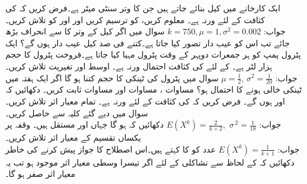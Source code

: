 ایک کارخانے میں کیل بنائے جاتے ہیں جن کا وتر  سنٹی میٹر ہے۔فرض کریں کہ  کی کثافت  کے لئے  ورنہ  ہے۔ معلوم کریں،  کو ترسیم کریں اور  اور  کو تلاش کریں۔ \\
جواب:\quad
$k=750,\mu=1,\sigma^2=0.002$
\quad
سوال  میں اگر کیل کے وتر کا  سے انحراف  بڑھ جائے تب اس کو عیب دار تصور کیا جاتا ہے۔کتنے فی صد کیل عیب دار ہوں گے؟
\quad
ایک پٹرول پمپ کو ہر جمعرات دوپہر کے وقت  پٹرول مہیا کیا جاتا ہے۔فروخت پٹرول کا حجم  ہزار لٹر ہے۔  کے لئے  کی کثافت احتمال  ورنہ  ہے۔ اوسط اور تغیریت تلاش کریں۔\\
جواب:\quad
$\mu=\tfrac{1}{2},\,\sigma^2=\tfrac{1}{20}$
\quad
سوال   میں پٹرول کی ٹینکی کا حجم کتنا ہو گا اگر ایک ہفتہ میں ٹینکی خالی ہونے کا احتمال  ہو؟
\quad
مساوات ، مساوات  اور مساوات  ثابت کریں۔
\quad
دکھائیں کہ  اور  ہوں گے۔
\quad
فرض کریں کہ  کی کثافت  کے لئے  ورنہ  ہے۔ تمام معیار اثر تلاش کریں۔سوال  میں دیے گئے کلیہ سے  حاصل کریں۔\\
جواب:\quad
$E(X^k)=\tfrac{2}{k+2},\,\,\sigma^{\,2}=\tfrac{1}{18}$
\quad
دکھائیں کہ  ہو گا جہاں  اور  مستقل ہیں۔
\quad
وقفہ  پر یکساں تقسیم کے معیار اثر تلاش کریں۔\\
جواب:\quad
$E(X^k)=\tfrac{1}{k+1}$
\quad {} \quad
عدد  کو  کا  کہتے ہیں۔اس اصطلاح کا جواز پیش کرنے کی خاطر دکھائیں کہ  کے لحاظ سے تشاکلی  کے لئے اگر تیسرا وسطی معیار اثر موجود ہو تب یہ معیار اثر صفر ہو گا۔ 
